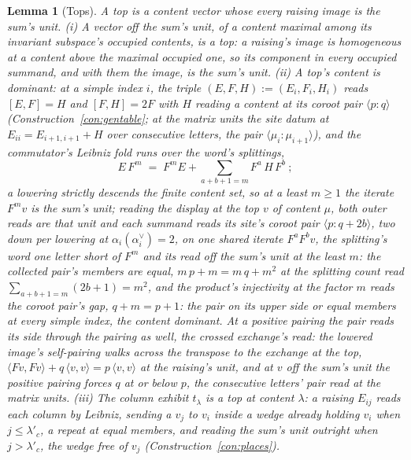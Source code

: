 \documentclass[11pt]{article}
\newtheorem{lemma}{Lemma}
\theoremstyle{definition}
\begin{document}
\begin{lemma}[Tops]\label{lem:tops}
A \emph{top} is a content vector whose every raising image is the
sum's unit. \emph{(i)} A vector off the sum's unit, of a content maximal among
its invariant subspace's occupied contents, is a top: a raising's image is homogeneous at a
content above the maximal occupied one, so its component in every
occupied summand, and with them the image, is the sum's unit.
\emph{(ii)} A top's content is
dominant: at a simple index $i$, the triple $(E,F,H):=(E_i,F_i,H_i)$
reads $[E,F]=H$ and $[F,H]=2F$ with $H$ reading a content at its
coroot pair $\langle p\!:\!q\rangle$
(Construction~\ref{con:gentable}; at the matrix units the site
datum at $E_{ii}=E_{i+1,i+1}+H$ over consecutive letters, the pair
$\langle\mu_i\!:\!\mu_{i+1}\rangle$), and the commutator's Leibniz
fold runs over the word's splittings,
\[
E\,F^m\;=\;F^mE+\sum_{a+b+1=m}F^{a}\,H\,F^{b}\ ;
\]
a lowering strictly descends the finite content set, so at a least
$m\ge1$ the iterate $F^mv$ is the sum's unit; reading the display at
the top $v$ of content $\mu$, both outer reads are that unit and each
summand reads its site's coroot pair
$\langle p\!:\!q{+}2b\rangle$, two down per lowering at
$\alpha_i(\alpha_i^\vee)=2$, on one shared iterate
$F^aF^bv$, the splitting's word one letter short of $F^m$ and its
read off the sum's unit at the least $m$: the collected pair's members are equal,
$m\,p+m=m\,q+m^2$ at the splitting count read
$\sum_{a+b+1=m}(2b+1)=m^2$, and the product's injectivity at the
factor $m$ reads the coroot pair's gap, $q+m=p+1$: the pair on its
upper side or equal members at every simple index, the content
dominant. At a positive pairing the pair reads its side through
the pairing as well, the crossed exchange's read: the lowered
image's self-pairing walks across the transpose to the exchange
at the top,
$\langle Fv,Fv\rangle+q\,\langle v,v\rangle
=p\,\langle v,v\rangle$ at the raising's unit, and at $v$ off
the sum's unit the positive pairing forces $q$ at or below $p$,
the consecutive letters' pair read at the matrix units.
\emph{(iii)} The column exhibit $t_\lambda$
is a top at content $\lambda$: a raising $E_{ij}$ reads each column by
Leibniz, sending a $v_j$ to $v_i$ inside a wedge already holding
$v_i$ when $j\le\lambda'_c$, a repeat at equal members, and reading
the sum's unit outright when $j>\lambda'_c$, the wedge free of $v_j$
(Construction~\ref{con:places}).
\end{lemma}
\end{document}
